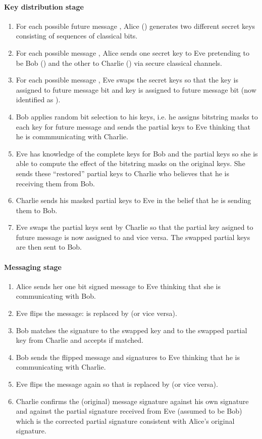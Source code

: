 \documentclass[english]{article}
\begin{document}
\paragraph{Key distribution stage}
\begin{enumerate}
\item For each possible future message , Alice () generates
two different secret keys consisting of sequences of classical bits.
\item For each possible message , Alice sends one secret key
to Eve  pretending to be Bob () and the other
to Charlie () via secure classical channels.
\item For each possible message , Eve  swaps
the secret keys so that the key  is assigned to future message
bit  and key  is assigned to future message bit
 (now identified as ).
\item Bob applies random bit selection to his keys, i.e. he assigns bitstring
masks to each key for future message  and sends the partial
keys  to Eve thinking that he is commmunicating
with Charlie.
\item Eve has knowledge of the complete keys for Bob and the partial keys
so she is able to compute the effect of the bitstring masks on the
original keys. She sends these ``restored'' partial keys 
to Charlie who believes that he is receiving them from Bob.
\item Charlie sends his masked partial keys  to
Eve in the belief that he is sending them to Bob.
\item Eve swaps the partial keys sent by Charlie so that the partial key
asigned to future message  is now assigned to 
and vice versa. The swapped partial keys 
are then sent to Bob.
\end{enumerate}

\paragraph{Messaging stage}
\begin{enumerate}
\item Alice sends her one bit signed message 
to Eve thinking that she is communicating with Bob.
\item Eve flips the message:  is replaced by  (or vice versa).
\item Bob matches the signature to the swapped key  and to the
swapped partial key from Charlie  and accepts if matched.
\item Bob sends the flipped message and signatures 
to Eve thinking that he is communicating with Charlie.
\item Eve flips the message again so that is replaced by  (or
vice versa).
\item Charlie confirms the (original) message signature against his own
signature and against the partial signature received from Eve (assumed
to be Bob) which is the corrected partial signature consistent with
Alice's original signature.
\end{enumerate}
\end{document}
